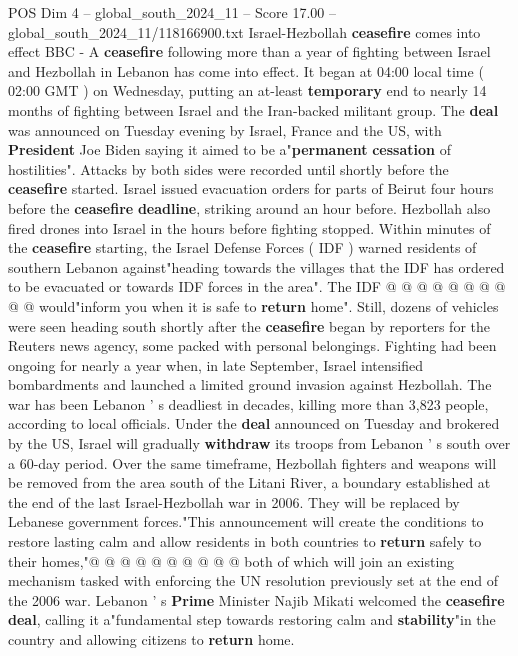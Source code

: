 \begin{textsample}{POS Dim 4 – global\_south\_2024\_11 – Score 17.00 – global\_south\_2024\_11/118166900.txt}  \label{ex:f4_pos_283}
Israel-Hezbollah \textbf{ceasefire} comes into effect BBC - A \textbf{ceasefire} following more than a year of fighting between Israel and Hezbollah in Lebanon has come into effect.
It began at 04:00 local time ( 02:00 GMT ) on Wednesday, putting an at-least \textbf{temporary} end to nearly 14 months of fighting between Israel and the Iran-backed militant group.
The \textbf{deal} was announced on Tuesday evening by Israel, France and the US, with \textbf{President} Joe Biden saying it aimed to be a"\textbf{permanent} \textbf{cessation} of hostilities".
Attacks by both sides were recorded until shortly before the \textbf{ceasefire} started.
Israel issued evacuation orders for parts of Beirut four hours before the \textbf{ceasefire} \textbf{deadline}, striking around an hour before.
Hezbollah also fired drones into Israel in the hours before fighting stopped.
Within minutes of the \textbf{ceasefire} starting, the Israel Defense Forces ( IDF ) warned residents of southern Lebanon against"heading towards the villages that the IDF has ordered to be evacuated or towards IDF forces in the area".
The IDF @ @ @ @ @ @ @ @ @ @ would"inform you when it is safe to \textbf{return} home".
Still, dozens of vehicles were seen heading south shortly after the \textbf{ceasefire} began by reporters for the Reuters news agency, some packed with personal belongings.
Fighting had been ongoing for nearly a year when, in late September, Israel intensified bombardments and launched a limited ground invasion against Hezbollah.
The war has been Lebanon ' s deadliest in decades, killing more than 3,823 people, according to local officials.
Under the \textbf{deal} announced on Tuesday and brokered by the US, Israel will gradually \textbf{withdraw} its troops from Lebanon ' s south over a 60-day period.
Over the same timeframe, Hezbollah fighters and weapons will be removed from the area south of the Litani River, a boundary established at the end of the last Israel-Hezbollah war in 2006.
They will be replaced by Lebanese government forces."This announcement will create the conditions to restore lasting calm and allow residents in both countries to \textbf{return} safely to their homes,"@ @ @ @ @ @ @ @ @ @ both of which will join an existing mechanism tasked with enforcing the UN resolution previously set at the end of the 2006 war.
Lebanon ' s \textbf{Prime} Minister Najib Mikati welcomed the \textbf{ceasefire} \textbf{deal}, calling it a"fundamental step towards restoring calm and \textbf{stability}"in the country and allowing citizens to \textbf{return} home.

\end{textsample}
